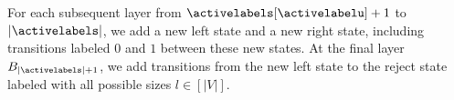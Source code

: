 
For each subsequent layer from $\activelabels[\activelabelu]+1$ to $|\activelabels|$, we add a new left state and a new right state, including transitions labeled $0$ and $1$ between these new states. At the final layer $B_{|\activelabels|+1}$, we add transitions from the new left state to the reject state labeled with all possible sizes $l \in [|V|]$.





